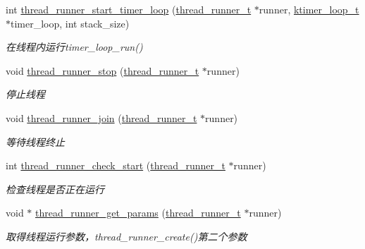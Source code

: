 \begin{DoxyCompactItemize}
int \hyperlink{a00107_ga9191991e2bd7f91fe68324c2855d581d_ga9191991e2bd7f91fe68324c2855d581d}{thread\+\_\+runner\+\_\+start\+\_\+timer\+\_\+loop} (\hyperlink{a00050_a9054159cde2f926ef61c28ce1e555199_a9054159cde2f926ef61c28ce1e555199}{thread\+\_\+runner\+\_\+t} $\ast$runner, \hyperlink{a00050_a024af2aa29615e7a811ea6c45438157d_a024af2aa29615e7a811ea6c45438157d}{ktimer\+\_\+loop\+\_\+t} $\ast$timer\+\_\+loop, int stack\+\_\+size)
\begin{DoxyCompactList}\small\item\em 在线程内运行timer\+\_\+loop\+\_\+run() \end{DoxyCompactList}\item 
void \hyperlink{a00107_gaa035f190ffd3d7f117b8fbb58716f042_gaa035f190ffd3d7f117b8fbb58716f042}{thread\+\_\+runner\+\_\+stop} (\hyperlink{a00050_a9054159cde2f926ef61c28ce1e555199_a9054159cde2f926ef61c28ce1e555199}{thread\+\_\+runner\+\_\+t} $\ast$runner)
\begin{DoxyCompactList}\small\item\em 停止线程 \end{DoxyCompactList}\item 
void \hyperlink{a00107_ga813a718c56e0923be9396630c8460794_ga813a718c56e0923be9396630c8460794}{thread\+\_\+runner\+\_\+join} (\hyperlink{a00050_a9054159cde2f926ef61c28ce1e555199_a9054159cde2f926ef61c28ce1e555199}{thread\+\_\+runner\+\_\+t} $\ast$runner)
\begin{DoxyCompactList}\small\item\em 等待线程终止 \end{DoxyCompactList}\item 
int \hyperlink{a00107_ga95c00ec3d6ef1710cc8d8bb8cb7e585d_ga95c00ec3d6ef1710cc8d8bb8cb7e585d}{thread\+\_\+runner\+\_\+check\+\_\+start} (\hyperlink{a00050_a9054159cde2f926ef61c28ce1e555199_a9054159cde2f926ef61c28ce1e555199}{thread\+\_\+runner\+\_\+t} $\ast$runner)
\begin{DoxyCompactList}\small\item\em 检查线程是否正在运行 \end{DoxyCompactList}\item 
void $\ast$ \hyperlink{a00107_gaf67fa2b2cfefc2de422a31b9dfad2bca_gaf67fa2b2cfefc2de422a31b9dfad2bca}{thread\+\_\+runner\+\_\+get\+\_\+params} (\hyperlink{a00050_a9054159cde2f926ef61c28ce1e555199_a9054159cde2f926ef61c28ce1e555199}{thread\+\_\+runner\+\_\+t} $\ast$runner)
\begin{DoxyCompactList}\small\item\em 取得线程运行参数，thread\+\_\+runner\+\_\+create()第二个参数 \end{DoxyCompactList}\item 

\end{DoxyCompactItemize}
